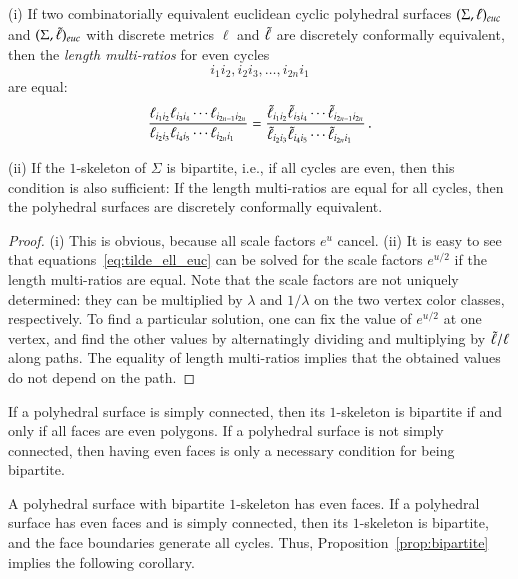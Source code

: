 \documentclass[Thesis]{subfiles}
\begin{document}
\begin{proposition}
  \label{prop:bipartite}
  (i) If two combinatorially equivalent euclidean cyclic polyhedral
  surfaces $(\Sigma,\ell)_{\euc}$ and\/ $(\Sigma,\ellt)_{\euc}$ with
  discrete metrics $\ell$ and $\tilde{\ell}$ are discretely conformally
  equivalent, then the\/ \emph{length multi-ratios} for even cycles
  \begin{equation*}
    i_{1}i_{2},i_{2}i_{3}, \ldots, i_{2n}i_{1}
  \end{equation*}
  are equal:
  \begin{equation}
    \label{eq:equal_multiratios}
    \frac{\ell_{i_{1}i_{2}}\ell_{i_{3}i_{4}}\cdots\ell_{i_{2n-1}i_{2n}}}
    {\ell_{i_{2}i_{3}}\ell_{i_{4}i_{5}}\cdots\ell_{i_{2n}i_{1}}\hfill}
    =
    \frac{\ellt_{i_{1}i_{2}}\ellt_{i_{3}i_{4}}\cdots\ellt_{i_{2n-1}i_{2n}}}
    {\ellt_{i_{2}i_{3}}\ellt_{i_{4}i_{5}}\cdots\ellt_{i_{2n}i_{1}}\hfill}    
    \,.
  \end{equation}
  
  (ii) If the $1$-skeleton of\/ $\Sigma$ is bipartite, i.e., if all
  cycles are even, then this condition is also sufficient: If the
  length multi-ratios are equal for all cycles, then the
  polyhedral surfaces are discretely conformally equivalent.
\end{proposition}

\begin{proof}
  (i) This is obvious, because all scale factors $e^{u}$ cancel.
  (ii) It is easy to see that equations~\eqref{eq:tilde_ell_euc} can
  be solved for the scale factors $e^{u/2}$ if the length multi-ratios
  are equal. Note that the scale factors are not uniquely determined:
  they can be multiplied by $\lambda$ and $1/\lambda$ on the two
  vertex color classes, respectively. To find a particular solution,
  one can fix the value of $e^{u/2}$ at one vertex, and find the
  other values by alternatingly dividing and multiplying by
  $\tilde{\ell}/\ell$ along paths. The equality of length multi-ratios
  implies that the obtained values do not depend on the path.
\end{proof}

\begin{remark}
  If a polyhedral surface is simply connected, then its $1$-skeleton
  is bipartite if and only if all faces are even polygons. If a
  polyhedral surface is not simply connected, then having even faces
  is only a necessary condition for being bipartite.
\end{remark}

A polyhedral surface with bipartite $1$-skeleton has even faces. If a
polyhedral surface has even faces and is simply connected, then its
$1$-skeleton is bipartite, and the face boundaries generate all
cycles. Thus, Proposition~\ref{prop:bipartite} implies the following
corollary.
\end{document}
